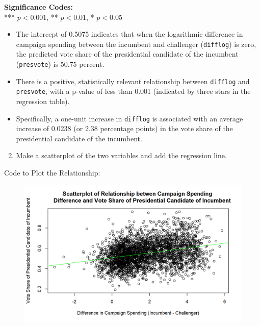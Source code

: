 \documentclass[12pt,letterpaper]{article}
\begin{document}
\vspace{0.1cm}
\noindent\textbf{Significance Codes:} \\
*** $p < 0.001$, ** $p < 0.01$, * $p < 0.05$

\vspace{0.5cm} \begin{itemize}[left=0pt, label=\textbullet]
	\item The intercept of 0.5075 indicates that when the logarithmic difference in campaign spending between the incumbent and challenger (\texttt{difflog}) is zero, the predicted vote share of the presidential candidate of the incumbent (\texttt{presvote}) is 50.75 percent.
	
	\item There is a positive, statistically relevant relationship between \texttt{difflog} and \texttt{presvote}, with a p-value of less than 0.001 (indicated by three stars in the regression table).
	
	\item Specifically, a one-unit increase in \texttt{difflog} is associated with an average increase of 0.0238 (or 2.38 percentage points) in the vote share of the presidential candidate of the incumbent.
\end{itemize}
\newpage
\vspace{0.5cm}\noindent\begin{enumerate}[left=0pt]	
\setcounter{enumi}{1}	
		\item Make a scatterplot of the two variables and add the regression line.
\end{enumerate}

\noindent Code to Plot the Relationship:

\begin{figure}[H]
	\centering
	\includegraphics[width=1\textwidth]{Figure_2_1.png}
\end{figure}
\end{document}
